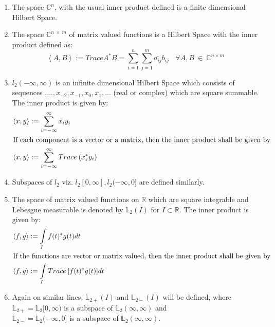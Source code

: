 \documentclass[a4paper,12pt]{article}
\begin{document}
			\begin{enumerate}
				\item The space $\mathbb{C}^{n}$, with the usual inner product defined is a finite dimensional Hilbert Space.
				\item The space $\mathbb{C}^{n\:\times\:m}$ of matrix valued functions is a Hilbert Space with the inner product defined as:
					\begin{equation}
						\left\langle A, B \right\rangle := Trace A^{*}B = \sum\limits_{i=1}^n \sum\limits_{j=1}^m \bar{a_{ij}}b_{ij} \:\:\:\: \forall A,B \:\in \:\mathbb{C}^{n \times m}
					\end{equation}
				\item $l_{2}(-\infty,\infty)$ is an infinite dimensional Hilbert Space which consists of sequences ${....,x_{-2},x_{-1},x_{0},x_{1},...}$ (real or complex) which are square summable. The inner product is given by:
					\begin{align*}
						\left\langle x, y \right\rangle &:= \sum\limits_{i=-\infty}^\infty \bar{x_{i}}y_{i}\\
						\intertext{If each component is a vector or a matrix, then the inner product shall be given by}
						\left\langle x, y \right\rangle &:= \sum\limits_{i=-\infty}^\infty Trace \: (x_{i}^{*}y_{i})\\						
					\end{align*}
				\item Subspaces of $l_{2}$ viz. $l_{2}[0,\infty],l_{2}(-\infty,0]$ are defined similarly.
				\item The space of matrix valued functions on $\mathbb{R}$ which are square integrable and Lebesgue measurable is denoted by $\mathbb{L}_{2}(I)$ for $I \subset \mathbb{R}$. The inner product is given by:
				\begin{align*}
						\left\langle f, g \right\rangle &:= \int\limits_{I}f(t)^*g(t)dt\\
						\intertext{If the functions are vector or matrix valued, then the inner product shall be given by}
						\left\langle f, g \right\rangle &:= \int\limits_{I} Trace \: [f(t)^{*}g(t)]dt\\						
					\end{align*}
				\item Again on similar lines, $\mathbb{L}_{2+}(I)$ and $\mathbb{L}_{2-}(I)$ will be defined, where\\ $\mathbb{L}_{2+} = \mathbb{L}_{2}[0,\infty)$ is a subspace of $\mathbb{L}_{2}(\infty,\infty)$ and \\
		$\mathbb{L}_{2-} = \mathbb{L}_{2}(-\infty,0]$ is a subspace of $\mathbb{L}_{2}(\infty,\infty)$.
		
			\end{enumerate}
\end{document}
